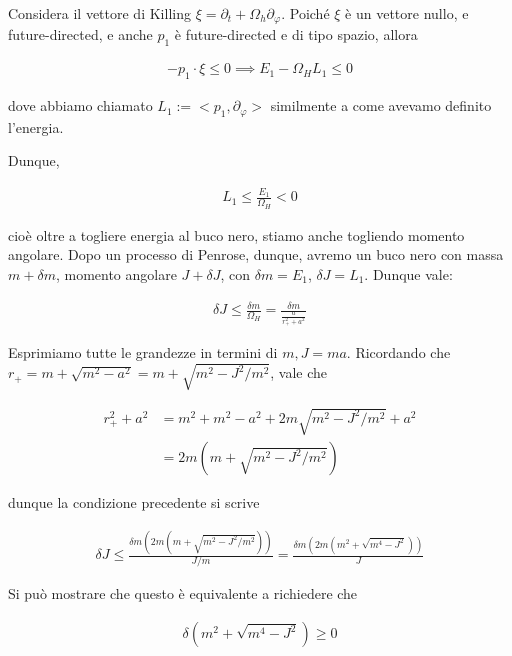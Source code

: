 \documentclass{report}
\begin{document}
Considera il vettore di Killing \(\xi = \partial_t + \Omega_h \partial_\varphi\). Poiché \(\xi\) è un vettore nullo, e future-directed, e anche \(p_1\) è future-directed e di tipo spazio, allora 

\begin{align}
    -p_1 \cdot \xi \leq 0 \implies E_1 - \Omega_H L_1 \leq 0 
\end{align}

dove abbiamo chiamato \(L_1 := <p_1, \partial_\varphi>\) similmente a come avevamo definito l'energia. 

Dunque, 

\begin{align}
    L_1 \leq \frac{E_1}{\Omega_H} < 0 
\end{align}

cioè oltre a togliere energia al buco nero, stiamo anche togliendo momento angolare. Dopo un processo di Penrose, dunque, avremo un buco nero con massa \(m + \delta m\), momento angolare \(J + \delta J\), con \(\delta m = E_1\), \(\delta J = L_1\). Dunque vale: 

\begin{align}
    \delta J \leq \frac{\delta m }{\Omega_H} = \frac{\delta m}{\frac{a}{r_+^2+a^2}}
\end{align}

Esprimiamo tutte le grandezze in termini di \(m, J = ma\). Ricordando che \(r_+ = m + \sqrt{m^2-a^2} = m + \sqrt{m^2 - J^2/m^2}\), vale che 

\begin{align}
    r_+^2 +a^2 &= m^2 + m^2 - a^2 + 2m\sqrt{m^2 - J^2/m^2} + a^2 \\ 
    &= 2m(m + \sqrt{m^2 - J^2/m^2})
\end{align}

dunque la condizione precedente si scrive 

\begin{align}
    \delta J \leq \frac{\delta m (2m(m + \sqrt{m^2 - J^2/m^2}))}{J/m} = \frac{\delta m (2m(m^2 + \sqrt{m^4 - J^2}))}{J} 
\end{align}

Si può mostrare che questo è equivalente a richiedere che 

\begin{align}
    \delta (m^2 + \sqrt{m^4 - J^2}) \geq 0 
\end{align}

\end{document}
